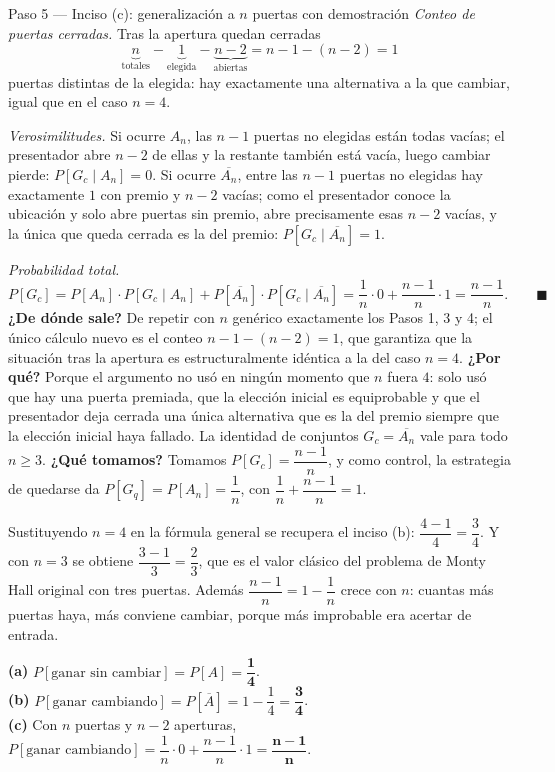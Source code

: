 \documentclass[11pt]{article}
\begin{document}
\begin{sol}
\begin{paso}{Paso 5 --- Inciso (c): generalizaci\'on a $n$ puertas con demostraci\'on}
\emph{Conteo de puertas cerradas.} Tras la apertura quedan cerradas
\[
\underbrace{n}_{\text{totales}}-\underbrace{1}_{\text{elegida}}-\underbrace{n-2}_{\text{abiertas}}
=n-1-(n-2)=1
\]
puertas distintas de la elegida: hay exactamente una alternativa a la que cambiar, igual que en el caso $n=4$.

\emph{Verosimilitudes.} Si ocurre $A_n$, las $n-1$ puertas no elegidas est\'an todas vac\'ias; el presentador abre $n-2$ de ellas y la restante tambi\'en est\'a vac\'ia, luego cambiar pierde: $P[G_{c}\mid A_n]=0$. Si ocurre $\overline{A_n}$, entre las $n-1$ puertas no elegidas hay exactamente $1$ con premio y $n-2$ vac\'ias; como el presentador conoce la ubicaci\'on y solo abre puertas sin premio, abre precisamente esas $n-2$ vac\'ias, y la \'unica que queda cerrada es la del premio: $P[G_{c}\mid\overline{A_n}]=1$.

\emph{Probabilidad total.}
\[
P[G_{c}]=P[A_n]\cdot P[G_{c}\mid A_n]+P[\overline{A_n}]\cdot P[G_{c}\mid \overline{A_n}]
=\frac1n\cdot 0+\frac{n-1}{n}\cdot 1=\frac{n-1}{n}. \qquad\blacksquare
\]
\textbf{¿De d\'onde sale?} De repetir con $n$ gen\'erico exactamente los Pasos 1, 3 y 4; el \'unico c\'alculo nuevo es el conteo $n-1-(n-2)=1$, que garantiza que la situaci\'on tras la apertura es estructuralmente id\'entica a la del caso $n=4$.
\textbf{¿Por qu\'e?} Porque el argumento no us\'o en ning\'un momento que $n$ fuera $4$: solo us\'o que hay una puerta premiada, que la elecci\'on inicial es equiprobable y que el presentador deja cerrada una \'unica alternativa que es la del premio siempre que la elecci\'on inicial haya fallado. La identidad de conjuntos $G_{c}=\overline{A_n}$ vale para todo $n\ge 3$.
\textbf{¿Qu\'e tomamos?} Tomamos $P[G_{c}]=\dfrac{n-1}{n}$, y como control, la estrategia de quedarse da $P[G_{q}]=P[A_n]=\dfrac1n$, con $\dfrac1n+\dfrac{n-1}{n}=1$.
\end{paso}

\begin{nota}
Sustituyendo $n=4$ en la f\'ormula general se recupera el inciso (b): $\dfrac{4-1}{4}=\dfrac34$. Y con $n=3$ se obtiene $\dfrac{3-1}{3}=\dfrac23$, que es el valor cl\'asico del problema de Monty Hall original con tres puertas. Adem\'as $\dfrac{n-1}{n}=1-\dfrac1n$ crece con $n$: cuantas m\'as puertas haya, m\'as conviene cambiar, porque m\'as improbable era acertar de entrada.
\end{nota}

\end{sol}

\begin{resp}
\textbf{(a)} $P[\text{ganar sin cambiar}]=P[A]=\mathbf{\dfrac14}$.\\[4pt]
\textbf{(b)} $P[\text{ganar cambiando}]=P[\overline{A}]=1-\dfrac14=\mathbf{\dfrac34}$.\\[4pt]
\textbf{(c)} Con $n$ puertas y $n-2$ aperturas, $P[\text{ganar cambiando}]=\dfrac1n\cdot 0+\dfrac{n-1}{n}\cdot 1=\mathbf{\dfrac{n-1}{n}}$.
\end{resp}
\end{document}
